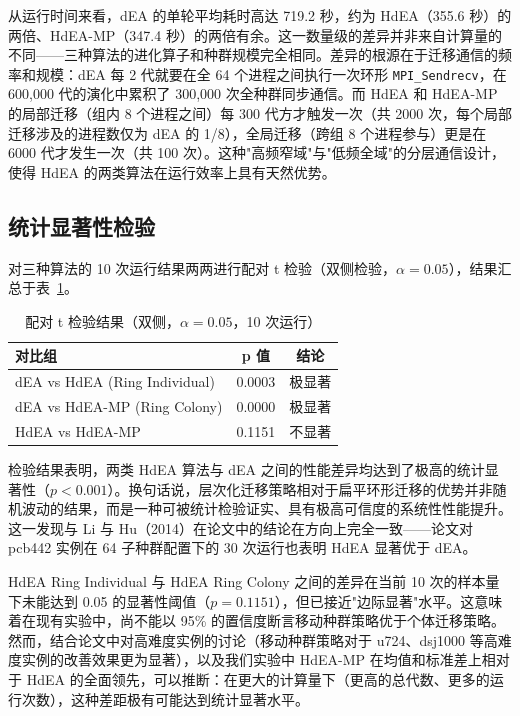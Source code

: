 从运行时间来看，dEA 的单轮平均耗时高达 719.2 秒，约为 HdEA（355.6 秒）的两倍、HdEA-MP（347.4 秒）的两倍有余。这一数量级的差异并非来自计算量的不同——三种算法的进化算子和种群规模完全相同。差异的根源在于迁移通信的频率和规模：dEA 每 2 代就要在全 64 个进程之间执行一次环形 \texttt{MPI\_Sendrecv}，在 600,000 代的演化中累积了 300,000 次全种群同步通信。而 HdEA 和 HdEA-MP 的局部迁移（组内 8 个进程之间）每 300 代方才触发一次（共 2000 次，每个局部迁移涉及的进程数仅为 dEA 的 1/8），全局迁移（跨组 8 个进程参与）更是在 6000 代才发生一次（共 100 次）。这种"高频窄域"与"低频全域"的分层通信设计，使得 HdEA 的两类算法在运行效率上具有天然优势。

\subsection{统计显著性检验}

对三种算法的 10 次运行结果两两进行配对 t 检验（双侧检验，$\alpha=0.05$），结果汇总于表~\ref{tab:ttest}。

\begin{table}[H]
\centering
\caption{配对 t 检验结果（双侧，$\alpha=0.05$，10 次运行）}
\label{tab:ttest}
\begin{tabular}{lcc}
\toprule
对比组 & p 值 & 结论 \\
\midrule
dEA vs HdEA (Ring Individual) & 0.0003 & 极显著 \\
dEA vs HdEA-MP (Ring Colony) & 0.0000 & 极显著 \\
HdEA vs HdEA-MP & 0.1151 & 不显著 \\
\bottomrule
\end{tabular}
\end{table}

检验结果表明，两类 HdEA 算法与 dEA 之间的性能差异均达到了极高的统计显著性（$p<0.001$）。换句话说，层次化迁移策略相对于扁平环形迁移的优势并非随机波动的结果，而是一种可被统计检验证实、具有极高可信度的系统性性能提升。这一发现与 Li 与 Hu（2014）在论文中的结论在方向上完全一致——论文对 pcb442 实例在 64 子种群配置下的 30 次运行也表明 HdEA 显著优于 dEA。

HdEA Ring Individual 与 HdEA Ring Colony 之间的差异在当前 10 次的样本量下未能达到 0.05 的显著性阈值（$p=0.1151$），但已接近"边际显著"水平。这意味着在现有实验中，尚不能以 95\% 的置信度断言移动种群策略优于个体迁移策略。然而，结合论文中对高难度实例的讨论（移动种群策略对于 u724、dsj1000 等高难度实例的改善效果更为显著），以及我们实验中 HdEA-MP 在均值和标准差上相对于 HdEA 的全面领先，可以推断：在更大的计算量下（更高的总代数、更多的运行次数），这种差距极有可能达到统计显著水平。

